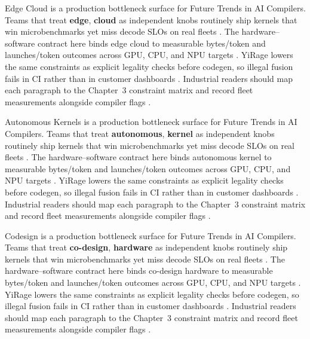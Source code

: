 Edge Cloud is a production bottleneck surface for Future Trends in AI Compilers. Teams that treat \textbf{edge}, \textbf{cloud} as independent knobs routinely ship kernels that win microbenchmarks yet miss decode SLOs on real fleets \citep{memoryfloor2026,amd2024xdna}. The hardware--software contract here binds edge cloud to measurable bytes/token and launches/token outcomes across GPU, CPU, and NPU targets \citep{nvidia2022hopper,amd2024aie}. YiRage lowers the same constraints as explicit legality checks before codegen, so illegal fusion fails in CI rather than in customer dashboards \citep{semianalysis2024tma,dlbook}. Industrial readers should map each paragraph to the Chapter~3 constraint matrix and record fleet measurements alongside compiler flags \citep{amd2024xdna,dao2022flashattention}.

Autonomous Kernels is a production bottleneck surface for Future Trends in AI Compilers. Teams that treat \textbf{autonomous}, \textbf{kernel} as independent knobs routinely ship kernels that win microbenchmarks yet miss decode SLOs on real fleets \citep{nvidia2022hopper,amd2024aie}. The hardware--software contract here binds autonomous kernel to measurable bytes/token and launches/token outcomes across GPU, CPU, and NPU targets \citep{semianalysis2024tma,dlbook}. YiRage lowers the same constraints as explicit legality checks before codegen, so illegal fusion fails in CI rather than in customer dashboards \citep{amd2024xdna,dao2022flashattention}. Industrial readers should map each paragraph to the Chapter~3 constraint matrix and record fleet measurements alongside compiler flags \citep{amd2024aie,kwon2023vllm}.

Codesign is a production bottleneck surface for Future Trends in AI Compilers. Teams that treat \textbf{co-design}, \textbf{hardware} as independent knobs routinely ship kernels that win microbenchmarks yet miss decode SLOs on real fleets \citep{semianalysis2024tma,dlbook}. The hardware--software contract here binds co-design hardware to measurable bytes/token and launches/token outcomes across GPU, CPU, and NPU targets \citep{amd2024xdna,dao2022flashattention}. YiRage lowers the same constraints as explicit legality checks before codegen, so illegal fusion fails in CI rather than in customer dashboards \citep{amd2024aie,kwon2023vllm}. Industrial readers should map each paragraph to the Chapter~3 constraint matrix and record fleet measurements alongside compiler flags \citep{dlbook,nvidia2024cudagraphs}.

